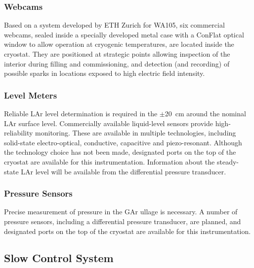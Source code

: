 \subsubsection{Webcams}
	Based on %
	a system developed by ETH Zurich for WA105, six commercial webcams, sealed inside a specially developed metal case with a ConFlat optical window to allow operation at cryogenic temperatures, are located inside the cryostat. They are positioned at strategic points allowing inspection of the interior during filling and commissioning, %
	and detection (and recording) of possible sparks in locations exposed to high %
	electric field intensity.
	
\subsubsection{Level Meters}
	Reliable LAr level determination is required in the $\pm$20~cm around the nominal LAr surface level. Commercially available liquid-level sensors provide high-reliability monitoring. These are available in multiple technologies, %
	including solid-state electro-optical, %
	conductive, capacitive and piezo-resonant. Although the technology choice has not been made, %
	designated ports on the top of the cryostat are available for this instrumentation.
Information about the steady-state LAr level will be available from the 
differential pressure transducer.
 
\subsubsection{Pressure Sensors}
	Precise measurement of pressure in the GAr ullage is necessary. A number of pressure sensors, including a differential pressure transducer, are planned, %
	and designated ports on the top of the cryostat are available for this instrumentation.

\subsection{Slow Control System}

